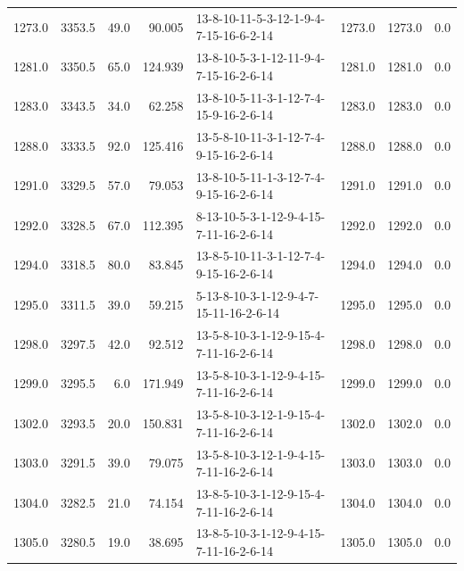 \begin{tabular}{rrrrlrrr}
 1273.0 &  3353.5 &           49.0 &             90.005 &  13-8-10-11-5-3-12-1-9-4-7-15-16-6-2-14 &        1273.0 &          1273.0 &       0.0 \\
 1281.0 &  3350.5 &           65.0 &            124.939 &  13-8-10-5-3-1-12-11-9-4-7-15-16-2-6-14 &        1281.0 &          1281.0 &       0.0 \\
 1283.0 &  3343.5 &           34.0 &             62.258 &  13-8-10-5-11-3-1-12-7-4-15-9-16-2-6-14 &        1283.0 &          1283.0 &       0.0 \\
 1288.0 &  3333.5 &           92.0 &            125.416 &  13-5-8-10-11-3-1-12-7-4-9-15-16-2-6-14 &        1288.0 &          1288.0 &       0.0 \\
 1291.0 &  3329.5 &           57.0 &             79.053 &  13-8-10-5-11-1-3-12-7-4-9-15-16-2-6-14 &        1291.0 &          1291.0 &       0.0 \\
 1292.0 &  3328.5 &           67.0 &            112.395 &  8-13-10-5-3-1-12-9-4-15-7-11-16-2-6-14 &        1292.0 &          1292.0 &       0.0 \\
 1294.0 &  3318.5 &           80.0 &             83.845 &  13-8-5-10-11-3-1-12-7-4-9-15-16-2-6-14 &        1294.0 &          1294.0 &       0.0 \\
 1295.0 &  3311.5 &           39.0 &             59.215 &  5-13-8-10-3-1-12-9-4-7-15-11-16-2-6-14 &        1295.0 &          1295.0 &       0.0 \\
 1298.0 &  3297.5 &           42.0 &             92.512 &  13-5-8-10-3-1-12-9-15-4-7-11-16-2-6-14 &        1298.0 &          1298.0 &       0.0 \\
 1299.0 &  3295.5 &            6.0 &            171.949 &  13-5-8-10-3-1-12-9-4-15-7-11-16-2-6-14 &        1299.0 &          1299.0 &       0.0 \\
 1302.0 &  3293.5 &           20.0 &            150.831 &  13-5-8-10-3-12-1-9-15-4-7-11-16-2-6-14 &        1302.0 &          1302.0 &       0.0 \\
 1303.0 &  3291.5 &           39.0 &             79.075 &  13-5-8-10-3-12-1-9-4-15-7-11-16-2-6-14 &        1303.0 &          1303.0 &       0.0 \\
 1304.0 &  3282.5 &           21.0 &             74.154 &  13-8-5-10-3-1-12-9-15-4-7-11-16-2-6-14 &        1304.0 &          1304.0 &       0.0 \\
 1305.0 &  3280.5 &           19.0 &             38.695 &  13-8-5-10-3-1-12-9-4-15-7-11-16-2-6-14 &        1305.0 &          1305.0 &       0.0 \\

\end{tabular}
